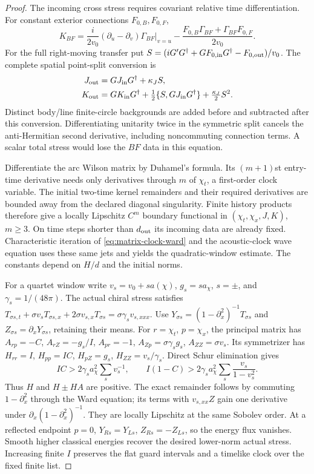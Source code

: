 \begin{proof}
The incoming cross stress requires covariant relative time
differentiation. For constant exterior connections $F_{0,B},F_{0,F}$,
\[
 K_{BF}=\frac{i}{2v_0}(\partial_u-\partial_v)\Gamma_{BF}|_{v=u}
 -\frac{F_{0,B}\Gamma_{BF}+\Gamma_{BF}F_{0,F}}{2v_0}.
\]
For the full right-moving transfer put
$S=(iG'G^\dagger+GF_{0,\rm in}G^\dagger-F_{0,\rm out})/v_0$.
The complete spatial point-split conversion is
\begin{align}
 J_{\rm out}&=GJ_{\rm in}G^\dagger+\kappa_JS,\notag\\
 K_{\rm out}&=GK_{\rm in}G^\dagger
 +\tfrac12\{S,GJ_{\rm in}G^\dagger\}
 +\tfrac{\kappa_J}2S^2.
 \label{eq:covariant-matrix-transfer}
\end{align}
Distinct body/line finite-circle backgrounds are added before and
subtracted after this conversion. Differentiating unitarity twice in
the symmetric split cancels the anti-Hermitian second derivative,
including noncommuting connection terms. A scalar total stress would
lose the $BF$ data in this equation.

Differentiate the arc Wilson matrix by Duhamel's formula. Its
$(m+1)$st entry-time derivative needs only derivatives through $m$
of $\chi_t$, a first-order clock variable. The initial two-time
kernel remainders and their required derivatives are bounded away
from the declared diagonal singularity. Finite history products
therefore give a locally Lipschitz $C^m$ boundary functional in
$(\chi_t,\chi_x,J,K)$, $m\ge3$. On time steps shorter than
$d_{\rm out}$ its incoming data are already fixed. Characteristic
iteration of \eqref{eq:matrix-clock-ward} and the acoustic-clock
wave equation uses these same jets and yields the quadratic-window
estimate. The constants depend on $H/d$ and the initial norms.

For a quartet window write $v_s=v_0+s a(\chi)$,
$g_s=s a_\chi$, $s=\pm$, and $\gamma_s=1/(48\pi)$.
The actual chiral stress satisfies
$T_{\sigma s,t}+\sigma v_sT_{\sigma s,x}
+2\sigma v_{s,x}T_{\sigma s}=\sigma\gamma_s v_{s,xxx}$.
Use $Y_{\sigma s}=(1-\partial_x^2)^{-1}T_{\sigma s}$ and
$Z_{\sigma s}=\partial_xY_{\sigma s}$, retaining their means.
For $r=\chi_t$, $p=\chi_x$, the principal matrix has
$A_{rp}=-C$, $A_{rZ}=-g_s/I$, $A_{pr}=-1$,
$A_{Zp}=\sigma\gamma_sg_s$, $A_{ZZ}=\sigma v_s$.
Its symmetrizer has $H_{rr}=I$, $H_{pp}=IC$,
$H_{pZ}=g_s$, $H_{ZZ}=v_s/\gamma_s$.
Direct Schur elimination gives
\begin{equation}
 IC>2\gamma_s a_\chi^2\sum_s v_s^{-1},\qquad
 I(1-C)>2\gamma_s a_\chi^2\sum_s\frac{v_s}{1-v_s^2}.
 \label{eq:quartet-clock-margins}
\end{equation}
Thus $H$ and $H\pm HA$ are positive. The exact remainder follows
by commuting $1-\partial_x^2$ through the Ward equation; its terms
with $v_{s,xx}Z$ gain one derivative under
$\partial_x(1-\partial_x^2)^{-1}$. They are locally Lipschitz
at the same Sobolev order. At a reflected endpoint $p=0$,
$Y_{Rs}=Y_{Ls}$, $Z_{Rs}=-Z_{Ls}$, so the energy flux vanishes.
Smooth higher classical energies recover the desired lower-norm
actual stress. Increasing finite $I$ preserves the flat guard
intervals and a timelike clock over the fixed finite list.


\end{proof}
